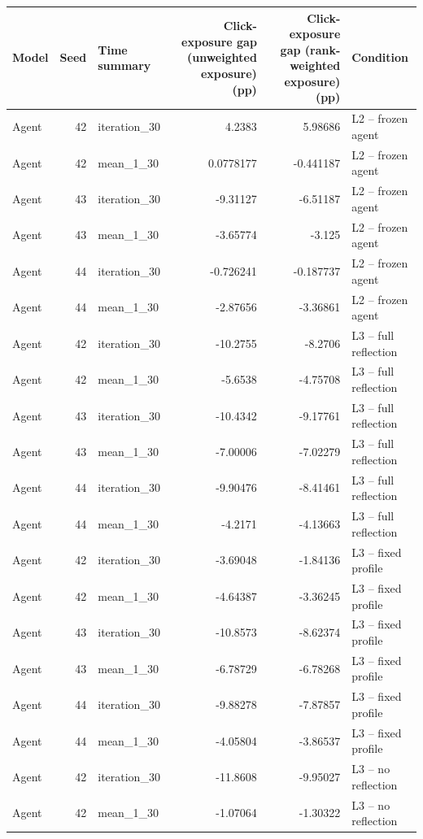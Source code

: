\begin{table}[htbp!]
\centering
\small
\setlength{\tabcolsep}{3pt}
\renewcommand{\arraystretch}{1.1}
\begin{tabular}{lrlrrl}
\hline
Model & Seed & Time summary & Click-exposure gap (unweighted exposure) (pp) & Click-exposure gap (rank-weighted exposure) (pp) & Condition \\
\hline
Agent & 42 & iteration\_30 & 4.2383 & 5.98686 & L2 -- frozen agent \\
Agent & 42 & mean\_1\_30 & 0.0778177 & -0.441187 & L2 -- frozen agent \\
Agent & 43 & iteration\_30 & -9.31127 & -6.51187 & L2 -- frozen agent \\
Agent & 43 & mean\_1\_30 & -3.65774 & -3.125 & L2 -- frozen agent \\
Agent & 44 & iteration\_30 & -0.726241 & -0.187737 & L2 -- frozen agent \\
Agent & 44 & mean\_1\_30 & -2.87656 & -3.36861 & L2 -- frozen agent \\
Agent & 42 & iteration\_30 & -10.2755 & -8.2706 & L3 -- full reflection \\
Agent & 42 & mean\_1\_30 & -5.6538 & -4.75708 & L3 -- full reflection \\
Agent & 43 & iteration\_30 & -10.4342 & -9.17761 & L3 -- full reflection \\
Agent & 43 & mean\_1\_30 & -7.00006 & -7.02279 & L3 -- full reflection \\
Agent & 44 & iteration\_30 & -9.90476 & -8.41461 & L3 -- full reflection \\
Agent & 44 & mean\_1\_30 & -4.2171 & -4.13663 & L3 -- full reflection \\
Agent & 42 & iteration\_30 & -3.69048 & -1.84136 & L3 -- fixed profile \\
Agent & 42 & mean\_1\_30 & -4.64387 & -3.36245 & L3 -- fixed profile \\
Agent & 43 & iteration\_30 & -10.8573 & -8.62374 & L3 -- fixed profile \\
Agent & 43 & mean\_1\_30 & -6.78729 & -6.78268 & L3 -- fixed profile \\
Agent & 44 & iteration\_30 & -9.88278 & -7.87857 & L3 -- fixed profile \\
Agent & 44 & mean\_1\_30 & -4.05804 & -3.86537 & L3 -- fixed profile \\
Agent & 42 & iteration\_30 & -11.8608 & -9.95027 & L3 -- no reflection \\
Agent & 42 & mean\_1\_30 & -1.07064 & -1.30322 & L3 -- no reflection \\

\end{tabular}
\end{table}
